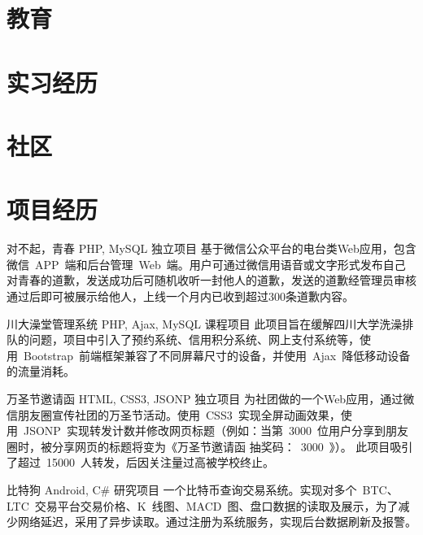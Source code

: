 \documentclass[11pt,a4paper]{moderncv}
\begin{document}
\maketitle

\section{教育}

\section{实习经历}

\section{社区}

\section{项目经历}
\renewcommand{\baselinestretch}{1.2}

{对不起，青春}
{PHP, MySQL}
{独立项目}{}
{基于微信公众平台的电台类Web应用，包含微信~APP~端和后台管理~Web~端。用户可通过微信用语音或文字形式发布自己对青春的道歉，发送成功后可随机收听一封他人的道歉，发送的道歉经管理员审核通过后即可被展示给他人，上线一个月内已收到超过300条道歉内容。}
\vspace*{0.8\baselineskip}

{川大澡堂管理系统}
{PHP, Ajax, MySQL}
{课程项目}{}
{此项目旨在缓解四川大学洗澡排队的问题，项目中引入了预约系统、信用积分系统、网上支付系统等，使用~Bootstrap~前端框架兼容了不同屏幕尺寸的设备，并使用~Ajax~降低移动设备的流量消耗。}
\vspace*{0.8\baselineskip}

{万圣节邀请函}
{HTML, CSS3, JSONP}
{独立项目}{}
{为社团做的一个Web应用，通过微信朋友圈宣传社团的万圣节活动。使用~CSS3~实现全屏动画效果，使用~JSONP~实现转发计数并修改网页标题（例如：当第~3000~位用户分享到朋友圈时，被分享网页的标题将变为《万圣节邀请函 抽奖码：~3000~》）。
此项目吸引了超过~15000~人转发，后因关注量过高被学校终止。}
\vspace*{0.8\baselineskip}

{比特狗}
{Android, C\#}
{研究项目}{}
{一个比特币查询交易系统。实现对多个~BTC、LTC~交易平台交易价格、K~线图、MACD~图、盘口数据的读取及展示，为了减少网络延迟，采用了异步读取。通过注册为系统服务，实现后台数据刷新及报警。}
\vspace*{0.8\baselineskip}
\end{document}
